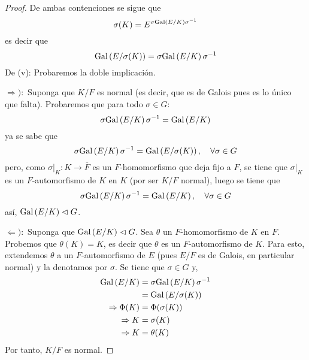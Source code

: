 \documentclass[12pt]{report}
\theoremstyle{largebreak}
\newcommand\cf[3]{\ensuremath{#1:#2\rightarrow#3}}
\begin{document}
\begin{proof}
        De ambas contenciones se sigue que
        \begin{equation*}
            \sigma(K)=E^{\sigma\textup{Gal}\left(E/K\right)\sigma^{-1}}
        \end{equation*}
        es decir que
        \begin{equation*}
            \textup{Gal}\left(E/\sigma(K)\right)=\sigma\textup{Gal}\left(E/K\right)\sigma^{-1}
        \end{equation*}
        De (v): Probaremos la doble implicación.

        $\Rightarrow):$ Suponga que $K/F$ es normal (es decir, que es de Galois pues es lo único que falta). Probaremos que para todo $\sigma\in G$:
        \begin{equation*}
            \sigma\textup{Gal}\left(E/K\right)\sigma^{-1}=\textup{Gal}\left(E/K\right)
        \end{equation*}
        ya se sabe que
        \begin{equation*}
            \sigma\textup{Gal}\left(E/K\right)\sigma^{-1}=\textup{Gal}\left(E/\sigma(K)\right),\quad\forall \sigma\in G
        \end{equation*}
        pero, como $\cf{\sigma\big|_K}{K}{\overline{F}}$ es un $F$-homomorfismo que deja fijo a $F$, se tiene que $\sigma\big|_K$ es un $F$-automorfismo de $K$ en $K$ (por ser $K/F$ normal), luego se tiene que
        \begin{equation*}
            \sigma\textup{Gal}\left(E/K\right)\sigma^{-1}=\textup{Gal}\left(E/K\right),\quad\forall\sigma\in G
        \end{equation*}
        así, $\textup{Gal}\left(E/K\right)\vartriangleleft G$.

        $\Leftarrow):$ Suponga que $\textup{Gal}\left(E/K\right)\vartriangleleft G$. Sea $\theta$ un $F$-homomorfismo de $K$ en $F$. Probemos que $\theta(K)=K$, es decir que $\theta$ es un $F$-automorfismo de $K$. Para esto, extendemos $\theta$ a un $F$-automorfismo de $E$ (pues $E/F$ es de Galois, en particular normal) y la denotamos por $\sigma$. Se tiene que $\sigma\in G$ y,
        \begin{equation*}
            \begin{split}
                \textup{Gal}\left(E/K\right)&=\sigma\textup{Gal}\left(E/K\right)\sigma^{-1}\\
                &=\textup{Gal}\left(E/\sigma(K)\right)\\
                \Rightarrow \Phi(K)&=\Phi(\sigma(K))\\
                \Rightarrow K&=\sigma(K)\\
                \Rightarrow K&=\theta(K)\\
            \end{split}
        \end{equation*}
        Por tanto, $K/F$ es normal.
        

\end{proof}
\end{document}

